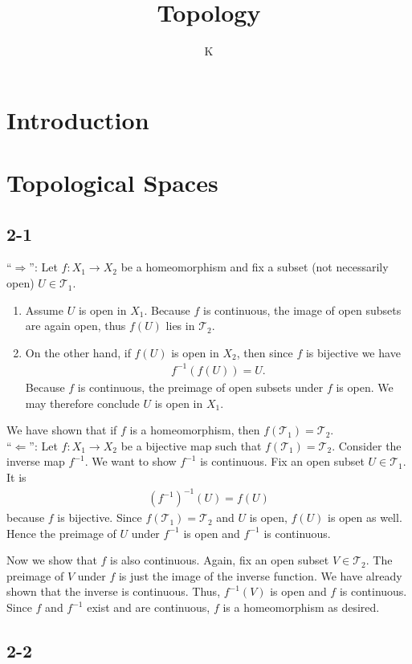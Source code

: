 \documentclass[a4paper]{book}
\title{Topology}
\author{K}
\theoremstyle{definition}
\begin{document}
\maketitle
\tableofcontents
\chapter{Introduction}
\chapter{Topological Spaces}
\section*{2-1}
``\(\Rightarrow\)'': Let \(f: X_1 \longrightarrow X_2\) be a homeomorphism and fix a subset (not necessarily open) \(U \in \mathcal{T}_1\).
\begin{enumerate}
    \item Assume \(U\) is open in \(X_1\). Because \(f\) is continuous, the image of open subsets are again open, thus \(f(U)\) lies in \(\mathcal{T}_2\).
    \item On the other hand, if \(f(U)\) is open in \(X_2\), then since \(f\) is bijective we have
    \begin{align*}
        f^{-1} \left(f \left(U\right)\right) = U \text{.}
    \end{align*}
    Because \(f\) is continuous, the preimage of open subsets under \(f\) is open. We may therefore conclude \(U\) is open in \(X_1\).
\end{enumerate}
We have shown that if \(f\) is a homeomorphism, then \(f(\mathcal{T}_1) = \mathcal{T}_2\). \\

\noindent ``\(\Leftarrow\)'': Let \(f: X_1 \longrightarrow X_2\) be a bijective map such that \(f(\mathcal{T}_1) = \mathcal{T}_2\). Consider the inverse map \(f^{-1}\). We want to show \(f^{-1}\) is continuous. Fix an open subset \(U \in \mathcal{T}_1\). It is
\begin{align*}
    \left(f^{-1}\right)^{-1} \left(U\right) = f(U)
\end{align*}
because \(f\) is bijective. Since \(f(\mathcal{T}_1) = \mathcal{T}_2\) and \(U\) is open, \(f(U)\) is open as well. Hence the preimage of \(U\) under \(f^{-1}\) is open and \(f^{-1}\) is continuous.

Now we show that \(f\) is also continuous. Again, fix an open subset \(V \in \mathcal{T}_2\). The preimage of \(V\) under \(f\) is just the image of the inverse function. We have already shown that the inverse is continuous. Thus, \(f^{-1}(V)\) is open and \(f\) is continuous. Since \(f\) and \(f^{-1}\) exist and are continuous, \(f\) is a homeomorphism as desired.

\section*{2-2}
\end{document}
